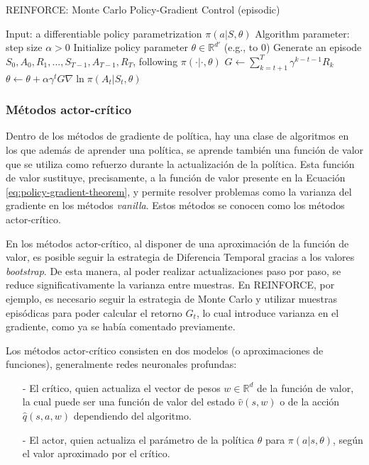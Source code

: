 \begin{algorithm}[H]
    \caption{REINFORCE: Monte Carlo Policy-Gradient Control (episodic)}
    \label{alg:reinforce}
    \begin{algorithmic}
        \State Input: a differentiable policy parametrization $\pi(a|S,\theta)$
        \State Algorithm parameter: step size $\alpha > 0$
        \State Initialize policy parameter $\theta \in \mathbb{R}^{d'}$ (e.g., to 0)
            \State Generate an episode $S_0, A_0, R_1, ..., S_{T-1}, A_{T-1}, R_T$, following $\pi(\cdot|\cdot, \theta)$
                \State $G \gets \sum_{k=t+1}^T \gamma^{k-t-1}R_k$
                \State $\theta \gets \theta + \alpha \gamma^t G \nabla \ln \pi(A_t|S_t,\theta)$
            \EndFor
        \EndFor
    \end{algorithmic}
\end{algorithm}

\subsubsection{Métodos actor-crítico}

Dentro de los métodos de gradiente de política, hay una clase de algoritmos en los que además de aprender una política, se aprende también una función de valor que se utiliza como refuerzo durante la actualización de la política. Esta función de valor sustituye, precisamente, a la función de valor presente en la Ecuación \ref{eq:policy-gradient-theorem}, y permite resolver problemas como la varianza del gradiente en los métodos \emph{vanilla}. Estos métodos se conocen como los métodos actor-crítico.

En los métodos actor-crítico, al disponer de una aproximación de la función de valor, es posible seguir la estrategia de Diferencia Temporal gracias a los valores \emph{bootstrap}. De esta manera, al poder realizar actualizaciones paso por paso, se reduce significativamente la varianza entre muestras. En REINFORCE, por ejemplo, es necesario seguir la estrategia de Monte Carlo y utilizar muestras episódicas para poder calcular el retorno $G_t$, lo cual introduce varianza en el gradiente, como ya se había comentado previamente.

Los métodos actor-crítico consisten en dos modelos (o aproximaciones de funciones), generalmente redes neuronales profundas:
\begin{enumerate}
    \item[-] El crítico, quien actualiza el vector de pesos $w \in \mathbb{R}^d$ de la función de valor, la cual puede ser una función de valor del estado $\hat{v}(s,w)$ o de la acción $\hat{q}(s,a,w)$ dependiendo del algoritmo.
    \item[-] El actor, quien actualiza el parámetro de la política $\theta$ para $\pi(a|s,\theta)$, según el valor aproximado por el crítico.
\end{enumerate}

